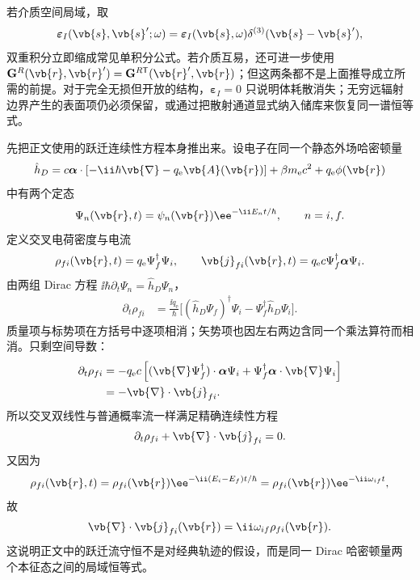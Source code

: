 \begin{derivation}
若介质空间局域，取
\[
\boldsymbol\varepsilon_I(\vb{s},\vb{s}';\omega)
=\boldsymbol\varepsilon_I(\vb{s},\omega)
\delta^{(3)}(\vb{s}-\vb{s}'),
\]
双重积分立即缩成常见单积分公式。若介质互易，还可进一步使用
$\mathbf G^R(\vb{r},\vb{r}')=\mathbf G^{R\mathsf T}(\vb{r}',\vb{r})$；但这两条都不是上面推导成立所需的前提。对于完全无损但开放的结构，$\boldsymbol\varepsilon_I=0$ 只说明体耗散消失；无穷远辐射边界产生的表面项仍必须保留，或通过把散射通道显式纳入储库来恢复同一谱恒等式。
\end{derivation}

\begin{derivation}[跃迁电流与环境激发率]
先把正文使用的跃迁连续性方程本身推出来。设电子在同一个静态外场哈密顿量
\begin{equation*}
\hat h_D
=c\boldsymbol\alpha\cdot[-\ii\hbar\vb{\nabla}-q_{\mathrm e}\vb{A}(\vb{r})]
+\beta m_{\mathrm e} c^2+q_{\mathrm e}\phi(\vb{r})
\end{equation*}
中有两个定态
\begin{equation*}
\Psi_n(\vb{r},t)=\psi_n(\vb{r})\ee^{-\ii E_nt/\hbar},
\qquad n=i,f.
\end{equation*}
定义交叉电荷密度与电流
\begin{equation*}
\rho_{fi}(\vb{r},t)
=q_{\mathrm e}\Psi_f^\dagger\Psi_i,
\qquad
\vb{j}_{fi}(\vb{r},t)
=q_{\mathrm e} c\Psi_f^\dagger\boldsymbol\alpha\Psi_i.
\end{equation*}
由两组 Dirac 方程
$\ii\hbar\partial_t\Psi_n=\hat h_D\Psi_n$，
\begin{align*}
\partial_t\rho_{fi}
&=\frac{\ii q_{\mathrm e}}{\hbar}
\bigl[(\hat h_D\Psi_f)^\dagger\Psi_i
-\Psi_f^\dagger\hat h_D\Psi_i\bigr].
\end{align*}
质量项与标势项在方括号中逐项相消；矢势项也因左右两边含同一个乘法算符而相消。只剩空间导数：
\begin{align*}
\partial_t\rho_{fi}
&=-q_{\mathrm e} c\left[
(\vb{\nabla}\Psi_f^\dagger)\cdot\boldsymbol\alpha\Psi_i
+\Psi_f^\dagger\boldsymbol\alpha\cdot\vb{\nabla}\Psi_i
\right]\\
&=-\vb{\nabla}\cdot\vb{j}_{fi}.
\end{align*}
所以交叉双线性与普通概率流一样满足精确连续性方程
\begin{equation*}
\partial_t\rho_{fi}+\vb{\nabla}\cdot\vb{j}_{fi}=0.
\end{equation*}
又因为
\begin{equation*}
\rho_{fi}(\vb{r},t)
=\rho_{fi}(\vb{r})\ee^{-\ii(E_i-E_f)t/\hbar}
=\rho_{fi}(\vb{r})\ee^{-\ii\omega_{if}t},
\end{equation*}
故
\begin{equation*}
{
\vb{\nabla}\cdot\vb{j}_{fi}(\vb{r})
=\ii\omega_{if}\rho_{fi}(\vb{r})}.
\end{equation*}
这说明正文中的跃迁流守恒不是对经典轨迹的假设，而是同一 Dirac 哈密顿量两个本征态之间的局域恒等式。


\end{derivation}
